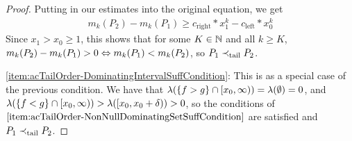 \documentclass[a4paper]{scrreprt}
\begin{document}
\begin{proof}
        Putting in our estimates into the original equation, we get
        \begin{gather*}
            m_k(P_2) - m_k(P_1)
            \geq c_{\text{right}}*x_1^k - c_{\text{left}} * x_0^k
        \end{gather*}
        Since $x_1 > x_0 \geq 1$, this shows that for some $K \in \mathbb{N}$ and all $k \geq K$, $m_k(P_2) - m_k(P_1) > 0 \Leftrightarrow m_k(P_1) < m_k(P_2)$, so $P_1 \prec_{\text{tail}} P_2$.
        
        \ref{item:acTailOrder-DominatingIntervalSuffCondition}:
        This is as a special case of the previous condition.
        We have that $\lambda(\{f > g\} \cap [x_0, \infty)) = \lambda(\emptyset) = 0$, and $\lambda(\{f < g\} \cap [x_0, \infty)) > \lambda([x_0, x_0 + \delta)) > 0$, so the conditions of $\ref{item:acTailOrder-NonNullDominatingSetSuffCondition}$ are satisfied and $P_1 \prec_{\text{tail}} P_2$.
    \end{proof}
\end{document}
